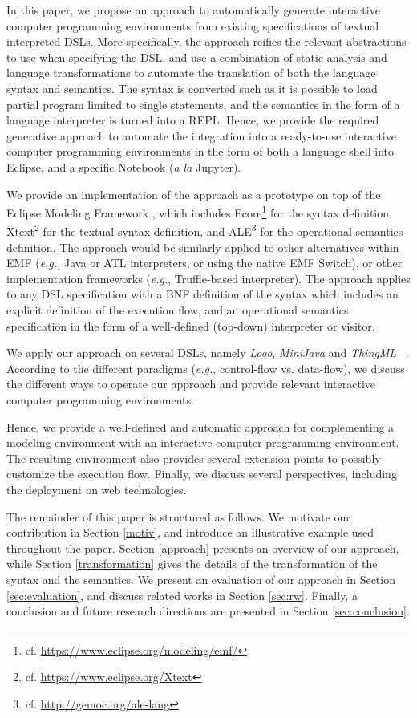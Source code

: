 In this paper, we propose an approach to automatically generate interactive computer programming environments from existing specifications of textual interpreted DSLs. More specifically, the approach reifies the relevant abstractions to use when specifying the DSL, and use a combination of static analysis and language transformations to automate the translation of both the language syntax and semantics. The syntax is converted such as it is possible to load partial program limited to single statements, and the semantics in the form of a language interpreter is turned into a REPL. Hence, we provide the required generative approach to automate the integration into a ready-to-use interactive computer programming environments in the form of both a language shell into Eclipse, and a specific Notebook (\emph{a la} Jupyter). 

We provide an implementation of the approach as a prototype on top of the Eclipse Modeling Framework \cite{steinberg2008emf}, which includes Ecore\footnote{cf. \url{https://www.eclipse.org/modeling/emf/}} for the syntax definition, Xtext\footnote{cf. \url{https://www.eclipse.org/Xtext}} for the textual syntax definition, and ALE\footnote{cf. \url{http://gemoc.org/ale-lang}} for the operational semantics definition. The approach would be similarly applied to other alternatives within EMF (\emph{e.g.,} Java or ATL interpreters, or using the native EMF Switch), or other implementation frameworks (\emph{e.g.}, Truffle-based interpreter). The approach applies to any DSL specification with a BNF definition of the syntax which includes an explicit definition of the execution flow, and an operational semantics specification in the form of a well-defined (top-down) interpreter or visitor.  

We apply our approach on several DSLs, namely \emph{Logo}, \emph{MiniJava} and \emph{ThingML}~\cite{Harrand:2016:TLC:2976767.2976812}%
. According to the different paradigms (\emph{e.g.}, control-flow vs. data-flow), we discuss the different ways to operate our approach and provide relevant interactive computer programming environments. 

Hence, we provide a well-defined and automatic approach for complementing a modeling environment with an interactive computer programming environment. The resulting environment also provides several extension points to possibly customize the execution flow. Finally, we discuss several perspectives, including the deployment on web technologies.	



The remainder of this paper is structured as follows. We motivate our contribution in Section \ref{motiv}, and introduce an illustrative example used throughout the paper. Section \ref{approach} presents an overview of our approach, while Section \ref{transformation} gives the details of the transformation of the syntax and the semantics. We present an evaluation of our approach in Section \ref{sec:evaluation}, and discuss related works in Section \ref{sec:rw}. Finally, a conclusion and future research directions are presented in Section \ref{sec:conclusion}.
